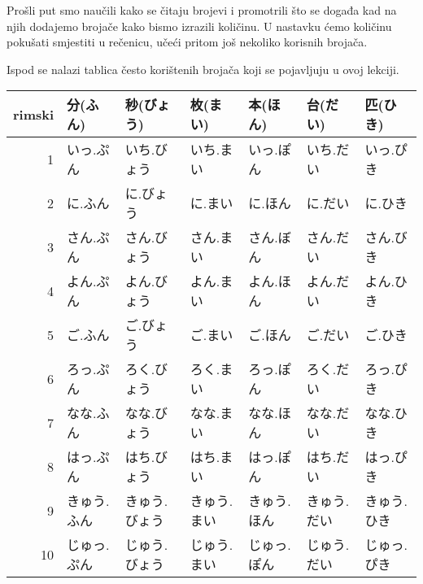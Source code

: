
\usepackage{xcolor}
\author{Tomislav Mamić}

	
	Prošli put smo naučili kako se čitaju brojevi i promotrili što se događa kad na njih dodajemo brojače kako bismo izrazili količinu. U nastavku ćemo količinu pokušati smjestiti u rečenicu, učeći pritom još nekoliko korisnih brojača.
	
	
	Ispod se nalazi tablica često korištenih brojača koji se pojavljuju u ovoj lekciji.
	
	\vspace{5pt}
	\begin{table}[h]
		\centering
		\begin{tabular}{r l l l l l l}\toprule[2pt]
			rimski & 分(ふん) & 秒(びょう) & 枚(まい) & 本(ほん) & 台(だい) & 匹(ひき) \\
			\midrule
			1	& \colorbox{blue!10}{いっ.ぷん} & いち.びょう & いち.まい & \colorbox{blue!10}{いっ.ぽん} & いち.だい & \colorbox{blue!10}{いっ.ぴき} \\
			2	& に.ふん & に.びょう & に.まい & に.ほん & に.だい & に.ひき \\
			3	& \colorbox{blue!10}{さん.ぷん} & さん.びょう & さん.まい & \colorbox{blue!10}{さん.ぼん} & さん.だい & \colorbox{blue!10}{さん.びき} \\
			4	& \colorbox{blue!10}{よん.ぷん} & よん.びょう & よん.まい & よん.ほん & よん.だい & よん.ひき \\
			5	& ご.ふん & ご.びょう & ご.まい & ご.ほん & ご.だい & ご.ひき \\
			6	& \colorbox{blue!10}{ろっ.ぷん} & ろく.びょう & ろく.まい & \colorbox{blue!10}{ろっ.ぽん} & ろく.だい & \colorbox{blue!10}{ろっ.ぴき} \\
			7	& なな.ふん & なな.びょう & なな.まい & なな.ほん & なな.だい & なな.ひき \\
			8	& \colorbox{blue!10}{はっ.ぷん} & はち.びょう & はち.まい & \colorbox{blue!10}{はっ.ぽん} & はち.だい & \colorbox{blue!10}{はっ.ぴき} \\
			9	& きゅう.ふん & きゅう.びょう & きゅう.まい & きゅう.ほん & きゅう.だい & きゅう.ひき \\
			10	& \colorbox{blue!10}{じゅっ.ぷん} & じゅう.びょう & じゅう.まい & \colorbox{blue!10}{じゅっ.ぽん} & じゅう.だい & \colorbox{blue!10}{じゅっ.ぴき} \\
			\bottomrule
		\end{tabular}
	\end{table}
	
